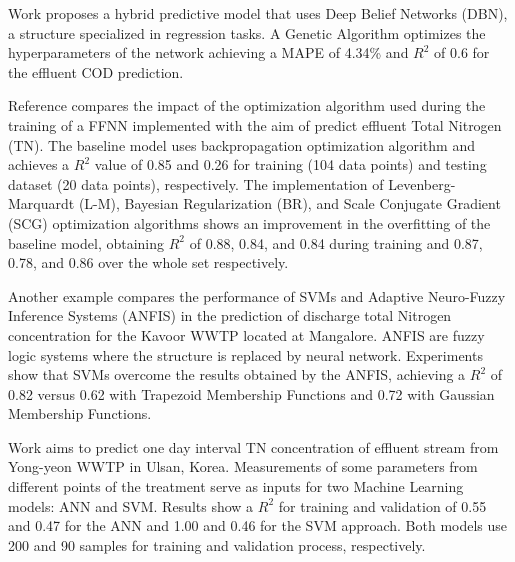 Work \cite{Niu2020} proposes a hybrid predictive model that uses Deep Belief Networks (DBN), a  structure specialized in regression tasks. A Genetic Algorithm optimizes the hyperparameters of the network achieving a MAPE of 4.34\% and \begin{math}R^2\end{math} of 0.6 for the effluent \ac{COD} prediction.

Reference \cite{Zhao2021} compares the impact of the optimization algorithm used during the training of a FFNN implemented with the aim of predict effluent Total Nitrogen (TN). The baseline model uses backpropagation optimization algorithm and achieves a \begin{math}R^2\end{math} value of 0.85 and 0.26 for training (104 data points) and testing dataset (20 data points), respectively. The implementation of Levenberg-Marquardt (L-M), Bayesian Regularization (BR), and Scale Conjugate Gradient (SCG) optimization algorithms shows an improvement in the overfitting of the baseline model, obtaining \begin{math}R^2\end{math} of 0.88, 0.84, and 0.84 during training and 0.87, 0.78, and 0.86 over the whole set respectively.

Another example \cite{Manu2017} compares the performance of  SVMs and Adaptive Neuro-Fuzzy Inference Systems (ANFIS) in the prediction of discharge total Nitrogen concentration for the Kavoor WWTP located at Mangalore. ANFIS are fuzzy logic systems where the structure is replaced by neural network. Experiments show that SVMs overcome the results obtained by the ANFIS, achieving a \begin{math}R^2\end{math} of 0.82 versus 0.62 with Trapezoid Membership Functions and 0.72 with Gaussian Membership Functions. 

Work \cite{Guo2015} aims to predict one day interval TN concentration of effluent stream from Yong-yeon \ac{WWTP} in Ulsan, Korea. Measurements of some parameters from different points of the treatment serve as inputs for two Machine Learning models: ANN and SVM. Results show a \begin{math}R^2\end{math} for training and validation of 0.55 and 0.47 for the ANN and 1.00 and 0.46 for the SVM approach. Both models use 200 and 90 samples for training and validation process, respectively.

